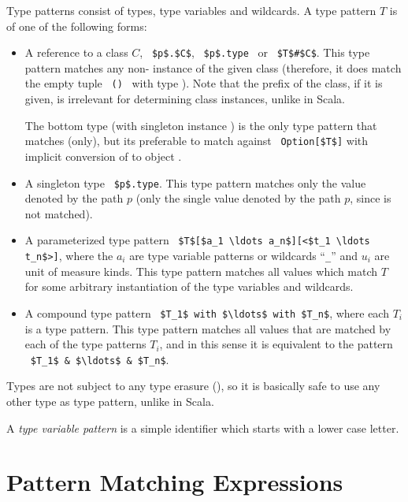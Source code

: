 Type patterns consist of types, type variables and wildcards. A type pattern $T$ is of one of the following forms: 
\begin{itemize}
\item[]
A reference to a class $C$, ~\lstinline!$p$.$C$!, ~\lstinline!$p$.type!~ or ~\lstinline!$T$#$C$!. This type pattern matches any non- instance of the given class (therefore, it does match the empty tuple ~\lstinline!()!~ with type ). Note that the prefix of the class, if it is given, is irrelevant for determining class instances, unlike in Scala. 

The bottom type  (with singleton instance ) is the only type pattern that matches  (only), but its preferable to match against ~\lstinline!Option[$T$]! with implicit conversion of  to object . 

\item[]
A singleton type ~\lstinline!$p$.type!. This type pattern matches only the value denoted by the path $p$ (only the single value denoted by the path $p$, since  is not matched). 

\item[]
A parameterized type pattern ~\lstinline!$T$[$a_1 \ldots a_n$][<$t_1 \ldots t_n$>]!, where the $a_i$ are type variable patterns or wildcards ``\lstinline!_!'' and $u_i$ are unit of measure kinds. This type pattern matches all values which match $T$ for some arbitrary instantiation of the type variables and wildcards.  

\item[]
A compound type pattern ~\lstinline!$T_1$ with $\ldots$ with $T_n$!, where each $T_i$ is a type pattern. This type pattern matches all values that are matched by each of the type patterns $T_i$, and in this sense it is equivalent to the pattern ~\lstinline!$T_1$ & $\ldots$ & $T_n$!. 
\end{itemize}

Types are not subject to any type erasure (), so it is basically safe to use any other type as type pattern, unlike in Scala. 

A {\em type variable pattern} is a simple identifier which starts with a lower case letter. 






\section{Pattern Matching Expressions}

